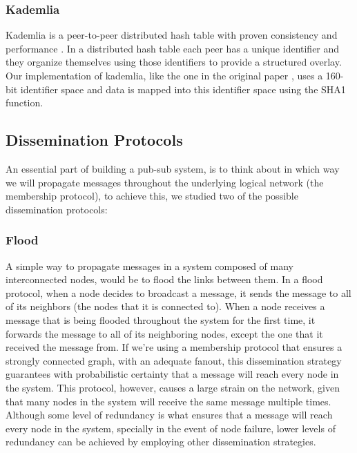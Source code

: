 \documentclass[sigconf]{acmart}
\begin{document}
\subsubsection{Kademlia} %
Kademlia is a peer-to-peer distributed hash table with proven consistency and performance \cite{maymounkov2002kademlia}.
In a distributed hash table each peer has a unique identifier and they organize themselves using those identifiers to provide a structured overlay.
Our implementation of kademlia, like the one in the original paper \cite{maymounkov2002kademlia}, uses a 160-bit identifier space and data is mapped into this identifier space using the SHA1 function.



\subsection{Dissemination Protocols}

An essential part of building a pub-sub system, is to think about in which way we will propagate messages throughout the underlying logical network (the membership protocol), to achieve this, we studied two of the possible dissemination protocols:

\subsubsection{Flood}

A simple way to propagate messages in a system composed of many interconnected nodes, would be to flood the links between them. In a flood protocol, when a node decides to broadcast a message, it sends the message to all of its neighbors (the nodes that it is connected to). When a node receives a message that is being flooded throughout the system for the first time, it forwards the message to all of its neighboring nodes, except the one that it received the message from.
If we're using a membership protocol that ensures a strongly connected graph, with an adequate fanout, this dissemination strategy guarantees with probabilistic certainty that a message will reach every node in the system.
This protocol, however, causes a large strain on the network, given that many nodes in the system will receive the same message multiple times. Although some level of redundancy is what ensures that a message will reach every node in the system, specially in the event of node failure, lower levels of redundancy can be achieved by employing other dissemination strategies.
\end{document}
